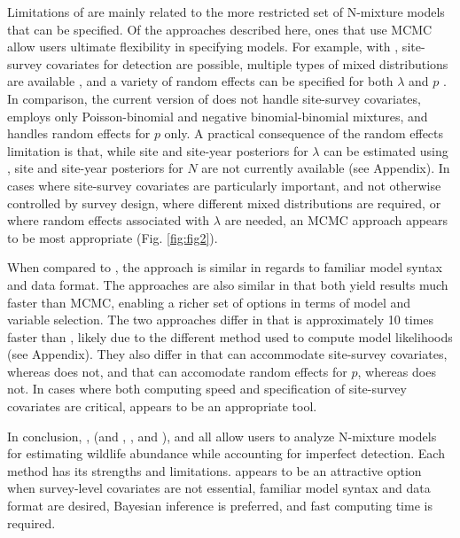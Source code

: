 \documentclass[codesnippet]{jss}
\begin{document}
Limitations of  are mainly related to the more restricted set of N-mixture models that can be specified. Of the approaches described here, ones that use MCMC allow users ultimate flexibility in specifying models. For example, with , site-survey covariates for detection are possible, multiple types of mixed distributions are available \citep{Joseph_Elkin_Martin_Possingham_2009,Martin_Royle_Mackenzie_Edwards_Kery_Gardner_2011}, and a variety of random effects can be specified for both $\lambda$ and $p$ \citep{Kery_Schaub_2011}. In comparison, the current version of  does not handle site-survey covariates, employs only Poisson-binomial and negative binomial-binomial mixtures, and handles random effects for $p$ only. A practical consequence of the random effects limitation is that, while site and site-year posteriors for $\lambda$ can be estimated using , site and site-year posteriors for $N$ are not currently available (see Appendix). In cases where site-survey covariates are particularly important, and not otherwise controlled by survey design, where different mixed distributions are required, or where random effects associated with $\lambda$ are needed, an MCMC approach appears to be most appropriate (Fig. \ref{fig:fig2}).

When compared to , the  approach is similar in 
regards to familiar model syntax and data format. The approaches are also 
similar in that both yield results much faster than MCMC, enabling a richer 
set of options in terms of model and variable selection. The two approaches 
differ in that  is approximately 10 times faster than 
, likely due to the different method used to compute model 
likelihoods (see Appendix). They also differ in that  can 
accommodate site-survey covariates, whereas  does not, and that 
 can accomodate random effects for $p$, whereas  
does not. In cases where both computing speed and specification of 
site-survey covariates are critical,  appears to be an 
appropriate tool.

In conclusion, ,  (and , , and ), and  all allow users to analyze N-mixture models for estimating wildlife abundance while accounting for imperfect detection. Each method has its strengths and limitations.  appears to be an attractive option when survey-level covariates are not essential, familiar model syntax and data format are desired, Bayesian inference is preferred, and fast computing time is required.
\end{document}
